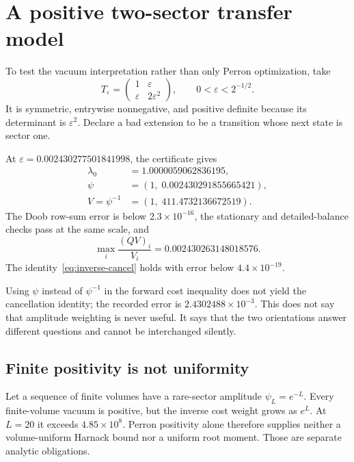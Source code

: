 \section{A positive two-sector transfer model}

To test the vacuum interpretation rather than only Perron optimization, take
\begin{equation}
 T_\varepsilon=
 \begin{pmatrix}
 1&\varepsilon\\
 \varepsilon&2\varepsilon^2
 \end{pmatrix},
 \qquad 0<\varepsilon<2^{-1/2}.
\end{equation}
It is symmetric, entrywise nonnegative, and positive definite because its
determinant is \(\varepsilon^2\).  Declare a bad extension to be a transition
whose next state is sector one.

At \(\varepsilon=0.002430277501841998\), the certificate gives
\begin{align}
 \lambda_0&=1.0000059062836195,\\
 \psi&=(1,\;0.002430291855665421),\\
 V=\psi^{-1}&=(1,\;411.4732136672519).
\end{align}
The Doob row-sum error is below \(2.3\times10^{-16}\), the stationary and
detailed-balance checks pass at the same scale, and
\begin{equation}
 \max_i\frac{(QV)_i}{V_i}=0.002430263148018576.
\end{equation}
The identity~\eqref{eq:inverse-cancel} holds with error below
\(4.4\times10^{-19}\).

Using \(\psi\) instead of \(\psi^{-1}\) in the forward cost inequality does
not yield the cancellation identity; the recorded error is
\(2.4302488\times10^{-3}\).  This does not say that amplitude weighting is
never useful.  It says that the two orientations answer different questions
and cannot be interchanged silently.

\subsection{Finite positivity is not uniformity}

Let a sequence of finite volumes have a rare-sector amplitude
\(\psi_L=e^{-L}\).  Every finite-volume vacuum is positive, but the inverse
cost weight grows as \(e^L\).  At \(L=20\) it exceeds
\(4.85\times10^8\).  Perron positivity alone therefore supplies neither a
volume-uniform Harnack bound nor a uniform root moment.  Those are separate
analytic obligations.
